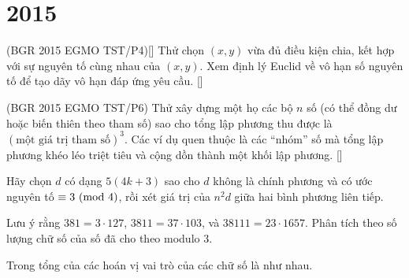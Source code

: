 \documentclass[./m.tex]{subfiles}
\begin{document}
\section{2015}

\begin{hint*}(\gls{BGR 2015 EGMO TST}/P4)[\footnotemark]
	Thử chọn \((x,y)\) vừa đủ điều kiện chia, kết hợp với sự nguyên tố cùng nhau của \((x,y)\).  
	Xem định lý Euclid về vô hạn số nguyên tố để tạo dãy vô hạn đáp ứng yêu cầu.
	[\textbf{}]
\end{hint*}


\begin{hint*}(\gls{BGR 2015 EGMO TST}/P6)
	Thử xây dựng một họ các bộ \( n \) số (có thể đồng dư hoặc biến thiên theo tham số) sao cho tổng lập phương thu được là \( (\text{một giá trị tham số})^3 \).  
	Các ví dụ quen thuộc là các “nhóm” số mà tổng lập phương khéo léo triệt tiêu và cộng dồn thành một khối lập phương.
	[\textbf{}]
\end{hint*}

\vspace{1em}

\begin{hint*}
	Hãy chọn \( d \) có dạng \( 5(4k + 3) \) sao cho \( d \) không là chính phương và có ước nguyên tố \( \equiv 3 \ (\mathrm{mod}\ 4) \),
	rồi xét giá trị của \( n^2 d \) giữa hai bình phương liên tiếp.
\end{hint*}

\vspace{1em}

\begin{hint*}
	Lưu ý rằng $381 = 3 \cdot 127$, $3811 = 37 \cdot 103$, và $38111 = 23 \cdot 1657.$
	Phân tích theo số lượng chữ số của số đã cho theo modulo \(3\).
\end{hint*}

\vspace{1em}

\begin{hint*}
	Trong tổng của các hoán vị vai trò của các chữ số là như nhau.
\end{hint*}

\vspace{1em}
\end{document}
